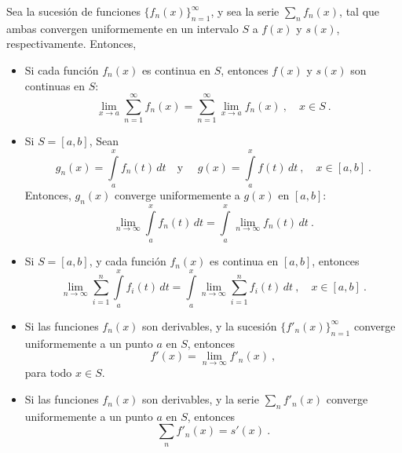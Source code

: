 \begin{teorema}
    Sea la sucesión de funciones $\{ f_n(x) \}_{n=1}^\infty$, y sea la serie $\sum\limits_n f_n(x)$, tal que ambas convergen uniformemente en un intervalo $S$ a $f(x)$ y $s(x)$, respectivamente. Entonces, 
    \begin{itemize}
        \item Si cada función $f_n(x)$ es continua en $S$, entonces $f(x)$ y $s(x)$ son continuas en $S$:
        \begin{equation*}
            \lim_{x \to a} \sum_{n = 1}^\infty f_n(x) = \sum_{n=1}^\infty \lim_{x \to a} f_n(x) \ , \quad x \in S \ .
        \end{equation*}
        \item Si $S = [a,b]$, Sean
        \begin{equation*}
            g_n(x) = \int\limits_a^x f_n(t) \, dt \quad \text{y } \quad g(x) = \int\limits_a^x f(t) \, dt \ ,  \quad x \in [a,b] \ . 
        \end{equation*}
        Entonces, $g_n(x)$ converge uniformemente a $g(x)$ en $[a,b]$:
        \begin{equation*}
            \lim_{n \to \infty} \int\limits_a^x f_n(t) \, dt = \int\limits_a^x \lim_{n \to \infty} f_n(t) \, dt \ .
        \end{equation*}
        \item Si $S = [a,b]$, y cada función $f_n(x)$ es continua en $[a,b]$, entonces 
        \begin{equation*}
            \lim_{n \to \infty} \sum_{i=1}^n \int\limits_a^x f_i(t) \, dt = \int\limits_a^x \lim_{n \to \infty} \sum_{i=1}^n f_i(t) \, dt \ , \quad x \in [a,b] \ . 
        \end{equation*} 
        \item Si las funciones $f_n(x)$ son derivables, y la sucesión $\{ f'_n(x) \}_{n=1}^\infty$ converge uniformemente a un punto $a$ en $S$, entonces 
        \begin{equation*}
            f'(x) = \lim_{n \to \infty} f'_n(x) \ ,
        \end{equation*}
        para todo $x \in S$.
        \item Si las funciones $f_n(x)$ son derivables, y la serie $\sum\limits_n f'_n(x)$ converge uniformemente a un punto $a$ en $S$, entonces 
        \begin{equation*}
            \sum_n f'_n(x) = s'(x) \ .
        \end{equation*}
    \end{itemize}
\end{teorema}

